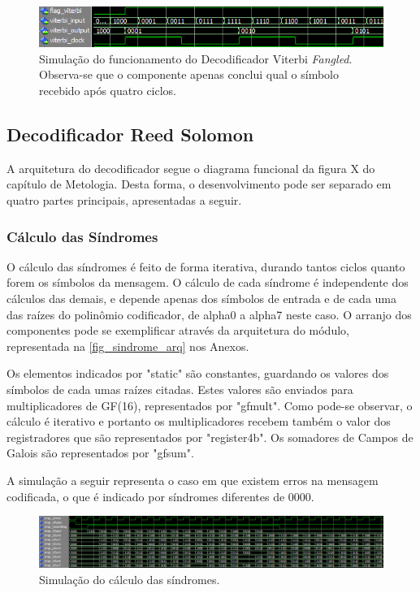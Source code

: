 	\begin{figure}[h]
		\caption{\label{figure:viterbi-simulation}Simulação do funcionamento do Decodificador Viterbi \textit{Fangled}. Observa-se que o componente apenas conclui qual o símbolo recebido após quatro ciclos.}
		\centering
		\includegraphics[width=0.6\textheight]{viterbi/simulation.png}
	\end{figure}
	
	
	\subsection{Decodificador Reed Solomon}
	
	A arquitetura do decodificador segue o diagrama funcional da figura X do capítulo de Metologia. Desta forma, o desenvolvimento pode ser separado em quatro partes principais, apresentadas a seguir.
	
	\subsubsection{Cálculo das Síndromes}
	
	O cálculo das síndromes é feito de forma iterativa, durando tantos ciclos quanto forem os símbolos da mensagem. O cálculo de cada síndrome é independente dos cálculos das demais, e depende apenas dos símbolos de entrada e de cada uma das raízes do polinômio codificador, de alpha0 a alpha7 neste caso. O arranjo dos componentes pode se exemplificar através da arquitetura do módulo, representada na \autoref{fig_sindrome_arq} nos Anexos.

	Os elementos indicados por "static" são constantes, guardando os valores dos símbolos de cada umas raízes citadas. Estes valores são enviados para multiplicadores de GF(16), representados por "gfmult". Como pode-se observar, o cálculo é iterativo e portanto os multiplicadores recebem também o valor dos registradores que são representados por "register4b". Os somadores de Campos de Galois são representados por "gfsum".
	
	A simulação a seguir representa o caso em que existem erros na mensagem codificada, o que é indicado por síndromes diferentes de 0000.
	
	\begin{figure}[h]
		\caption{\label{fig_sindrome_sim}Simulação do cálculo das síndromes.}
		\centering
		\includegraphics[width=1\textwidth]{RS/Sim_sindrome.PNG}
	\end{figure}


